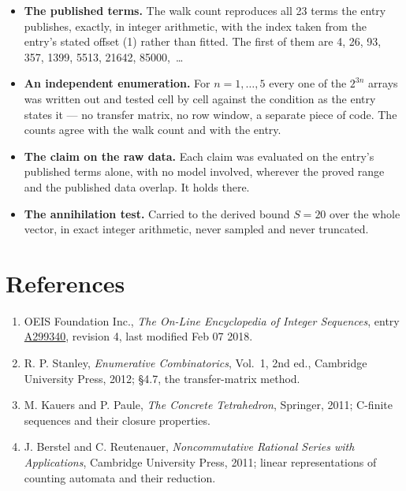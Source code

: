 \documentclass[11pt]{article}
\theoremstyle{definition}
\begin{document}
\begin{itemize}

\item {\bfseries The published terms.} The walk count reproduces all 23 terms the entry publishes, exactly, in integer arithmetic, with the index taken from the entry's stated offset (1) rather than fitted. The first of them are 4, 26, 93, 357, 1399, 5513, 21642, 85000,~\dots

\item {\bfseries An independent enumeration.} For $n = 1,\dots,5$ every one of the $2^{3n}$ arrays was written out and tested cell by cell against the condition as the entry states it --- no transfer matrix, no row window, a separate piece of code. The counts agree with the walk count and with the entry.

\item {\bfseries The claim on the raw data.} Each claim was evaluated on the entry's published terms alone, with no model involved, wherever the proved range and the published data overlap. It holds there.

\item {\bfseries The annihilation test.} Carried to the derived bound $S = 20$ over the whole vector, in exact integer arithmetic, never sampled and never truncated.

\end{itemize}

\section{References}

\begin{enumerate}

\item OEIS Foundation Inc., \emph{The On-Line Encyclopedia of Integer Sequences}, entry \href{https://oeis.org/A299340}{A299340}, revision 4, last modified Feb 07 2018.

\item R. P. Stanley, \emph{Enumerative Combinatorics}, Vol.~1, 2nd ed., Cambridge University Press, 2012; \S4.7, the transfer-matrix method.

\item M. Kauers and P. Paule, \emph{The Concrete Tetrahedron}, Springer, 2011; C-finite sequences and their closure properties.

\item J. Berstel and C. Reutenauer, \emph{Noncommutative Rational Series with Applications}, Cambridge University Press, 2011; linear representations of counting automata and their reduction.

\end{enumerate}
\end{document}
